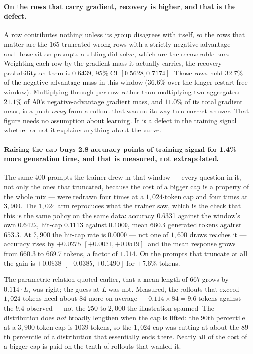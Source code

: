 \paragraph{On the rows that carry gradient, recovery is higher, and that is the defect.} A row
contributes nothing unless its group disagrees with itself, so the rows that matter are the
$165$ truncated-wrong rows with a strictly negative advantage --- and those sit on prompts a
sibling did solve, which are the recoverable ones. Weighting each row by the gradient mass it
actually carries, the recovery probability on them is $\mathbf{0.6439}$, $95\%$ CI
$[0.5628, 0.7174]$. Those rows hold $32.7\%$ of the negative-advantage mass in this window
($36.6\%$ over the longer restart-free window). Multiplying through per row rather than
multiplying two aggregates: $\mathbf{21.1\%}$ of A0's negative-advantage gradient mass, and
$\mathbf{11.0\%}$ of its total gradient mass, is a push \emph{away} from a rollout that was
on its way to a correct answer. That figure needs no assumption about learning. It is a defect
in the training signal whether or not it explains anything about the curve.

\paragraph{Raising the cap buys 2.8 accuracy points of training signal for
1.4\% more generation time, and that is measured, not extrapolated.} The same $400$
prompts the trainer drew in that window --- every question in it, not only the ones that
truncated, because the cost of a bigger cap is a property of the whole mix --- were redrawn
four times at a $1{,}024$-token cap and four times at $3{,}900$. The $1{,}024$ arm reproduces
what the trainer saw, which is the check that this is the same policy on the same data:
accuracy 0.6331 against the window's own $0.6422$, hit-cap 0.1113 against $0.1000$,
mean 660.3 generated tokens against $653.3$. At $3{,}900$ the hit-cap rate is
$\mathbf{0.0000}$ --- not one of $1{,}600$ draws reaches it --- accuracy rises by
$\mathbf{+0.0275}$ $[+0.0031, +0.0519]$, and the mean response grows from
660.3 to 669.7 tokens, a factor of $1.014$. On the prompts that truncate at
all the gain is $+0.0938$ $[+0.0385, +0.1490]$ for $+7.6\%$ tokens.

The parametric relation quoted earlier, that a mean length of $667$ grows by
$0.114\cdot L$, was right; the guess at $L$ was not. Measured, the rollouts that exceed
$1{,}024$ tokens need about $84$ more on average --- $0.114 \times 84 = 9.6$ tokens against
the $9.4$ observed --- not the $250$ to $2{,}000$ the illustration spanned. The distribution
does \emph{not} broadly lengthen when the cap is lifted: the $90$th percentile at a
$3{,}900$-token cap is $1039$ tokens, so the $1{,}024$ cap was cutting at about the
$89$th percentile of a distribution that essentially ends there. Nearly all of the cost of a
bigger cap is paid on the tenth of rollouts that wanted it.

